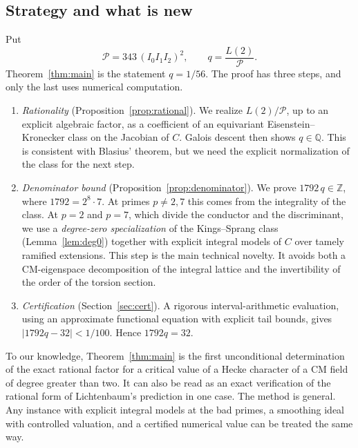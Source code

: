 \documentclass[11pt]{amsart}
\theoremstyle{remark}
\theoremstyle{definition}
\newcommand{\Q}{\mathbb{Q}}
\newcommand{\Z}{\mathbb{Z}}
\newcommand{\Per}{\mathcal{P}}
\begin{document}
\subsection{Strategy and what is new}
Put
\begin{equation}\label{eq:q}
\Per=343\,(I_0I_1I_2)^2,\qquad q=\frac{L(2)}{\Per}.
\end{equation}
Theorem~\ref{thm:main} is the statement $q=1/56$. The proof has three steps, and only the last uses numerical computation.
\begin{enumerate}
\item \emph{Rationality} (Proposition~\ref{prop:rational}). We realize $L(2)/\Per$, up to an explicit algebraic factor, as a coefficient of an equivariant Eisenstein--Kronecker class on the Jacobian of $C$. Galois descent then shows $q\in\Q$. This is consistent with Blasius' theorem, but we need the explicit normalization of the class for the next step.
\item \emph{Denominator bound} (Proposition~\ref{prop:denominator}). We prove $1792\,q\in\Z$, where $1792=2^8\cdot7$. At primes $p\ne2,7$ this comes from the integrality of the class. At $p=2$ and $p=7$, which divide the conductor and the discriminant, we use a \emph{degree-zero specialization} of the Kings--Sprang class (Lemma~\ref{lem:deg0}) together with explicit integral models of $C$ over tamely ramified extensions. This step is the main technical novelty. It avoids both a CM-eigenspace decomposition of the integral lattice and the invertibility of the order of the torsion section.
\item \emph{Certification} (Section~\ref{sec:cert}). A rigorous interval-arithmetic evaluation, using an approximate functional equation with explicit tail bounds, gives $|1792q-32|<1/100$. Hence $1792q=32$.
\end{enumerate}

To our knowledge, Theorem~\ref{thm:main} is the first unconditional determination of the exact rational factor for a critical value of a Hecke character of a CM field of degree greater than two. %
It can also be read as an exact verification of the rational form of Lichtenbaum's prediction in one case. The method is general. Any instance with explicit integral models at the bad primes, a smoothing ideal with controlled valuation, and a certified numerical value can be treated the same way.
\end{document}
